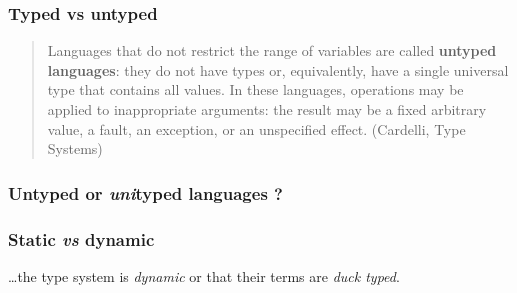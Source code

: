 \documentclass{beamer}
\begin{document}
\begin{frame}

    \frametitle{Typed vs untyped}

    \begin{quotation}
    
        Languages that do not restrict the range of variables are called
        \textbf{untyped languages}: they do not have types or,
        equivalently, have a single universal type that contains all
        values. In these languages, operations may be applied to
        inappropriate arguments: the result may be a fixed arbitrary
        value, a fault, an exception, or an unspecified effect.
        (Cardelli, Type Systems)
    
    \end{quotation}

\end{frame}

\begin{frame}

    \frametitle{Untyped or \textit{uni}typed languages ?}

    \begin{itemize}
    
    
    
    
    \end{itemize}

\end{frame}

\begin{frame}

    \frametitle{Static \textit{vs} dynamic}

    \dots the type system is \textit{dynamic} or that their terms are
    \textit{duck typed}.

    \begin{itemize}
    
    
    
    
    \end{itemize}

\end{frame}
\end{document}
